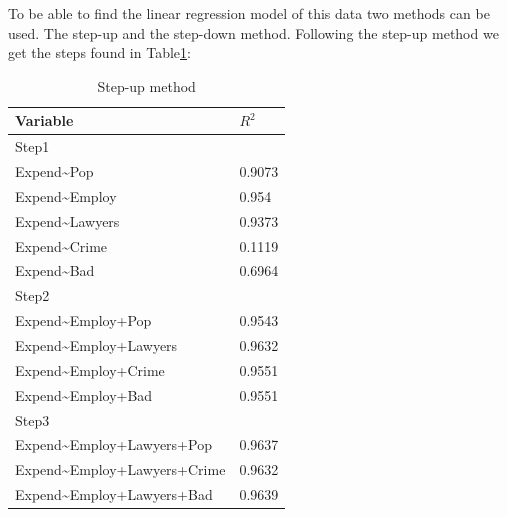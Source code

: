 \documentclass{article}
\begin{document}
    To be able to find the linear regression model of this data two methods can be used.
    The step-up and the step-down method.
    Following the step-up method we get the steps found in Table\ref{table:step-up}:
    \begin{table}
    \begin{center}
    \begin{tabular}{|ll|}
        \hline
        Variable & $R^2$ \\
        \hline 
        Step1&\\
        \hline
        Expend\textasciitilde Pop & 0.9073 \\
        Expend\textasciitilde Employ & 0.954 \\
        Expend\textasciitilde Lawyers & 0.9373 \\
        Expend\textasciitilde Crime & 0.1119 \\
        Expend\textasciitilde Bad & 0.6964 \\
        \hline
        Step2&\\
        \hline 
        Expend\textasciitilde Employ+Pop & 0.9543 \\
        Expend\textasciitilde Employ+Lawyers & 0.9632 \\
        Expend\textasciitilde Employ+Crime & 0.9551 \\
        Expend\textasciitilde Employ+Bad & 0.9551 \\
        \hline
        Step3&\\
        \hline 
        Expend\textasciitilde Employ+Lawyers+Pop & 0.9637 \\
        Expend\textasciitilde Employ+Lawyers+Crime & 0.9632 \\
        Expend\textasciitilde Employ+Lawyers+Bad & 0.9639 \\
        \hline
    \end{tabular}
    \caption{Step-up method}
    \label{table:step-up}
    \end{center}
    \end{table}
\end{document}
